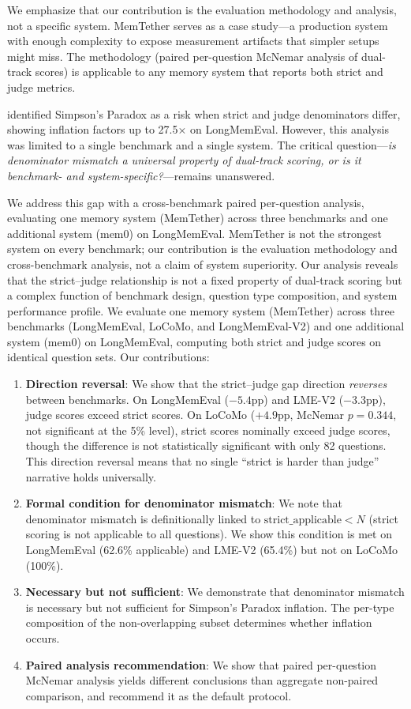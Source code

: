 \documentclass[10pt]{article}
\begin{document}
We emphasize that our contribution is the evaluation methodology and analysis, not a specific system. MemTether serves as a case study—a production system with enough complexity to expose measurement artifacts that simpler setups might miss. The methodology (paired per-question McNemar analysis of dual-track scores) is applicable to any memory system that reports both strict and judge metrics.

\citet{anonymous2026simpson} identified Simpson's Paradox as a risk when strict and judge denominators differ, showing inflation factors up to 27.5$\times$ on LongMemEval. However, this analysis was limited to a single benchmark and a single system. The critical question---\emph{is denominator mismatch a universal property of dual-track scoring, or is it benchmark- and system-specific?}---remains unanswered.

We address this gap with a cross-benchmark paired per-question analysis, evaluating one memory system (MemTether) across three benchmarks and one additional system (mem0) on LongMemEval. MemTether is not the strongest system on every benchmark; our contribution is the evaluation methodology and cross-benchmark analysis, not a claim of system superiority. Our analysis reveals that the strict--judge relationship is not a fixed property of dual-track scoring but a complex function of benchmark design, question type composition, and system performance profile. We evaluate one memory system (MemTether) across three benchmarks (LongMemEval, LoCoMo, and LongMemEval-V2) and one additional system (mem0) on LongMemEval, computing both strict and judge scores on identical question sets. Our contributions:

\begin{enumerate}
\item \textbf{Direction reversal}: We show that the strict--judge gap direction \emph{reverses} between benchmarks. On LongMemEval ($-5.4$pp) and LME-V2 ($-3.3$pp), judge scores exceed strict scores. On LoCoMo ($+4.9$pp, McNemar $p = 0.344$, not significant at the 5\% level), strict scores nominally exceed judge scores, though the difference is not statistically significant with only 82 questions. This direction reversal means that no single ``strict is harder than judge'' narrative holds universally.
\item \textbf{Formal condition for denominator mismatch}: We note that denominator mismatch is definitionally linked to $\text{strict\_applicable} < N$ (strict scoring is not applicable to all questions). We show this condition is met on LongMemEval (62.6\% applicable) and LME-V2 (65.4\%) but not on LoCoMo (100\%).
\item \textbf{Necessary but not sufficient}: We demonstrate that denominator mismatch is necessary but not sufficient for Simpson's Paradox inflation. The per-type composition of the non-overlapping subset determines whether inflation occurs.
\item \textbf{Paired analysis recommendation}: We show that paired per-question McNemar analysis yields different conclusions than aggregate non-paired comparison, and recommend it as the default protocol.
\end{enumerate}
\end{document}
